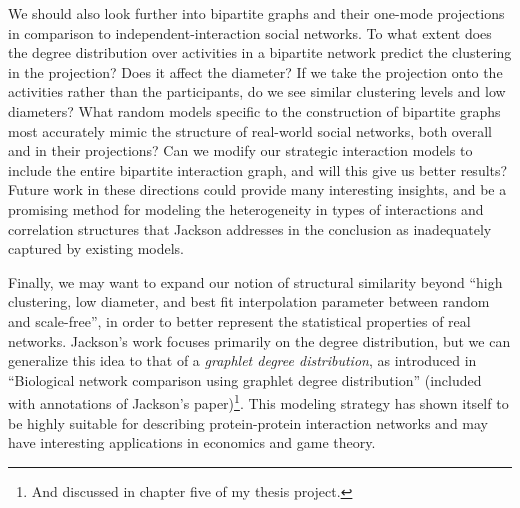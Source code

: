 \documentclass[11pt]{article}
\begin{document}
We should also look further into bipartite graphs and their one-mode projections in comparison to independent-interaction social networks. To what extent does the degree distribution over activities in a bipartite network predict the clustering in the projection? Does it affect the diameter? If we take the projection onto the activities rather than the participants, do we see similar clustering levels and low diameters? What random models specific to the construction of bipartite graphs most accurately mimic the structure of real-world social networks, both overall and in their projections? Can we modify our strategic interaction models to include the entire bipartite interaction graph, and will this give us better results? Future work in these directions could provide many interesting insights, and be a promising method for modeling the heterogeneity in types of interactions and correlation structures that Jackson addresses in the conclusion as inadequately captured by existing models.

Finally, we may want to expand our notion of structural similarity beyond ``high clustering, low diameter, and best fit interpolation parameter between random and scale-free'', in order to better represent the statistical properties of real networks. Jackson's work focuses primarily on the degree distribution, but we can generalize this idea to that of a \textit{graphlet degree distribution}, as introduced in ``Biological network comparison using graphlet degree distribution'' (included with annotations of Jackson's paper)\footnote{And discussed in chapter five of my thesis project.}. This modeling strategy has shown itself to be highly suitable for describing protein-protein interaction networks and may have interesting applications in economics and game theory.
\end{document}

